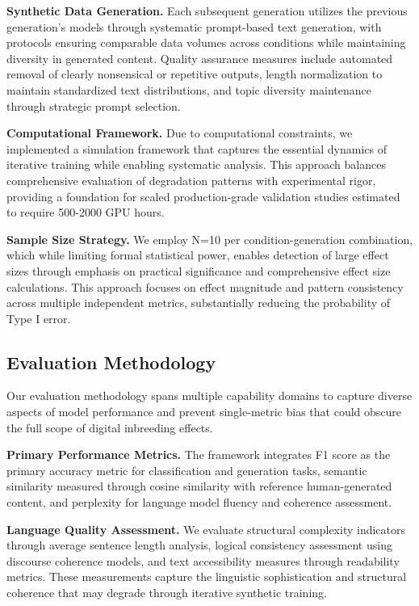 \documentclass{article}
\begin{document}
\textbf{Synthetic Data Generation.} Each subsequent generation utilizes the previous generation's models through systematic prompt-based text generation, with protocols ensuring comparable data volumes across conditions while maintaining diversity in generated content. Quality assurance measures include automated removal of clearly nonsensical or repetitive outputs, length normalization to maintain standardized text distributions, and topic diversity maintenance through strategic prompt selection.

\textbf{Computational Framework.} Due to computational constraints, we implemented a simulation framework that captures the essential dynamics of iterative training while enabling systematic analysis. This approach balances comprehensive evaluation of degradation patterns with experimental rigor, providing a foundation for scaled production-grade validation studies estimated to require 500-2000 GPU hours.

\textbf{Sample Size Strategy.} We employ N=10 per condition-generation combination, which while limiting formal statistical power, enables detection of large effect sizes through emphasis on practical significance and comprehensive effect size calculations. This approach focuses on effect magnitude and pattern consistency across multiple independent metrics, substantially reducing the probability of Type I error.

\subsection{Evaluation Methodology}

Our evaluation methodology spans multiple capability domains to capture diverse aspects of model performance and prevent single-metric bias that could obscure the full scope of digital inbreeding effects.

\textbf{Primary Performance Metrics.} The framework integrates F1 score as the primary accuracy metric for classification and generation tasks, semantic similarity measured through cosine similarity with reference human-generated content, and perplexity for language model fluency and coherence assessment.

\textbf{Language Quality Assessment.} We evaluate structural complexity indicators through average sentence length analysis, logical consistency assessment using discourse coherence models, and text accessibility measures through readability metrics. These measurements capture the linguistic sophistication and structural coherence that may degrade through iterative synthetic training.
\end{document}
